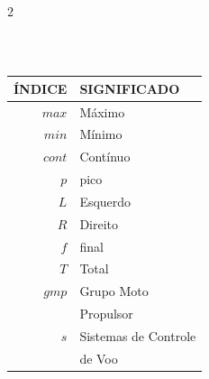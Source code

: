 \begin{multicols}{2}
\begin{table}[H]
\begin{tabular}{|r|l|}
    

\end{tabular}\\
\end{table}

\begin{table}[H]
    \centering
    \begin{tabular}{|r|l|}
    \hline
    \textbf{ÍNDICE} & \textbf{SIGNIFICADO} \\
    \hline
    \hline
    $max$  & Máximo \\
    \hline
    $min$  & Mínimo \\
    \hline
    $cont$ & Contínuo\\
    \hline
    $p$    & pico \\
    \hline
    $L$    & Esquerdo \\
    \hline
    $R$    & Direito \\
    \hline
    $f$    & final\\
    \hline
    $T$    & Total \\
    \hline
    $gmp$  & Grupo Moto \\& Propulsor \\
    \hline
    $s$    & Sistemas de Controle \\ & de Voo \\
    \hline
    
    
\end{tabular}\\
\end{table}
\label{sig:lista}
\end{multicols} 